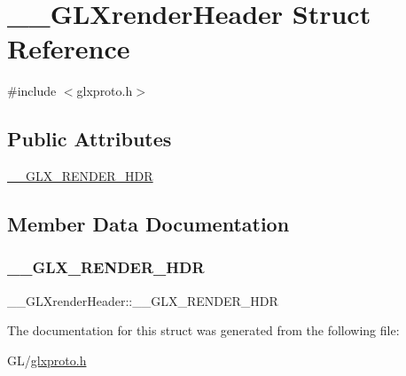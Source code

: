 \hypertarget{struct_____g_l_xrender_header}{}\section{\+\_\+\+\_\+\+G\+L\+Xrender\+Header Struct Reference}
\label{struct_____g_l_xrender_header}


{\ttfamily \#include $<$glxproto.\+h$>$}

\subsection*{Public Attributes}
\begin{DoxyCompactItemize}
\item 
\hyperlink{struct_____g_l_xrender_header_a4e121aba980fd890f00cf4d17114b926}{\+\_\+\+\_\+\+G\+L\+X\+\_\+\+R\+E\+N\+D\+E\+R\+\_\+\+H\+DR}
\end{DoxyCompactItemize}


\subsection{Member Data Documentation}
\mbox{\label{struct_____g_l_xrender_header_a4e121aba980fd890f00cf4d17114b926}} 
\subsubsection{\texorpdfstring{\+\_\+\+\_\+\+G\+L\+X\+\_\+\+R\+E\+N\+D\+E\+R\+\_\+\+H\+DR}{\_\_GLX\_RENDER\_HDR}}
{\footnotesize\ttfamily \+\_\+\+\_\+\+G\+L\+Xrender\+Header\+::\+\_\+\+\_\+\+G\+L\+X\+\_\+\+R\+E\+N\+D\+E\+R\+\_\+\+H\+DR}



The documentation for this struct was generated from the following file\+:\begin{DoxyCompactItemize}
\item 
G\+L/\hyperlink{glxproto_8h}{glxproto.\+h}\end{DoxyCompactItemize}
